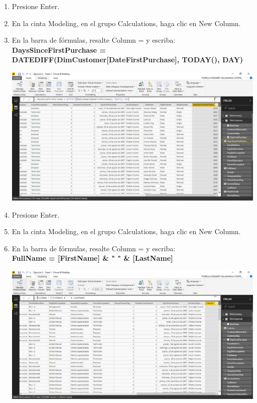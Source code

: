 \begin{enumerate}[1.]
    \item Presione Enter.
    \item En la cinta Modeling, en el grupo Calculations, haga clic en New Column.
    \item En la barra de fórmulas, resalte Column = y escriba: \\

\textbf{DaysSinceFirstPurchase = DATEDIFF(DimCustomer[DateFirstPurchase], TODAY(), DAY)}\\

	\begin{center}
	\includegraphics[width=17cm]{./Imagenes/Ejercicio2-Tarea1/22}
	\end{center}	

    \item Presione Enter.
    \item En la cinta Modeling, en el grupo Calculations, haga clic en New Column.
    \item En la barra de fórmulas, resalte Column = y escriba: \\

\textbf{FullName = [FirstName] \& " " \& [LastName]}\\

	\begin{center}
	\includegraphics[width=17cm]{./Imagenes/Ejercicio2-Tarea1/3}
	\end{center}	


\end{enumerate}
